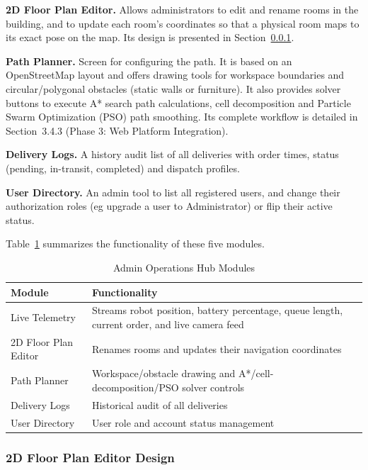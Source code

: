 \textbf{2D Floor Plan Editor.} Allows administrators to edit and rename rooms in the building, and to update each room's coordinates so that a physical room maps to its exact pose on the map. Its design is presented in Section~\ref{sec:floor_plan_editor}.

\textbf{Path Planner.} Screen for configuring the path. It is based on an OpenStreetMap layout and offers drawing tools for workspace boundaries and circular/polygonal obstacles (static walls or furniture). It also provides solver buttons to execute A* search path calculations, cell decomposition and Particle Swarm Optimization (PSO) path smoothing. Its complete workflow is detailed in Section~3.4.3 (Phase 3: Web Platform Integration).

\textbf{Delivery Logs.} A history audit list of all deliveries with order times, status (pending, in-transit, completed) and dispatch profiles.

\textbf{User Directory.} An admin tool to list all registered users, and change their authorization roles (eg upgrade a user to Administrator) or flip their active status.

Table~\ref{tab:admin_modules} summarizes the functionality of these five modules.

\begin{table}[H]
	\centering
	\caption{Admin Operations Hub Modules}
	\label{tab:admin_modules}
	\begin{tabular}{|p{4cm}|p{10.5cm}|}
		\hline
		\textbf{Module} & \textbf{Functionality} \\
		\hline
		Live Telemetry & Streams robot position, battery percentage, queue length, current order, and live camera feed \\
		\hline
		2D Floor Plan Editor & Renames rooms and updates their navigation coordinates \\
		\hline
		Path Planner & Workspace/obstacle drawing and A*/cell-decomposition/PSO solver controls \\
		\hline
		Delivery Logs & Historical audit of all deliveries \\
		\hline
		User Directory & User role and account status management \\
		\hline
	\end{tabular}
\end{table}

\subsubsection{2D Floor Plan Editor Design}
\label{sec:floor_plan_editor}

